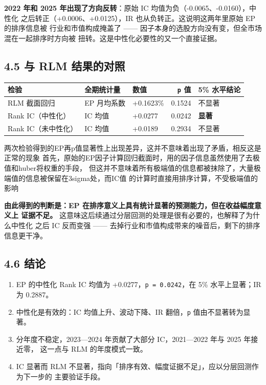 \documentclass[UTF8,a4paper,11pt]{ctexart}
\begin{document}
\textbf{2022 年和 2025 年出现了方向反转}：原始 IC 均值为负（-0.0065、-0.0160），中性化
之后转正（+0.0006、+0.0125），IR 也从负转正。这说明这两年里原始 EP 的排序信息被
行业和市值构成掩盖了 —— 因子本身的选股方向没有变，但全市场混在一起排序时方向被
扭转。这是中性化必要性的又一个直接证据。

{}
\subsection*{4.5 与 RLM 结果的对照}

\begin{table}[htbp]
\centering
\begin{tabularx}{\textwidth}{@{}YYYRY@{}}
\toprule
检验 & 全期统计量 & 数值 & \texttt{p} 值 & 5\% 水平结论 \\
\midrule
RLM 截面回归 & EP 月均系数 & +0.1623\% & 0.1524 & 不显著 \\
Rank IC（中性化） & IC 均值 & +0.0277 & 0.0242 & \textbf{显著} \\
Rank IC（未中性化） & IC 均值 & +0.0189 & 0.2934 & 不显著 \\
\bottomrule
\end{tabularx}
\end{table}

两次检验得到的EP再p值显著性上出现差异，这并不意味着出现了矛盾，相反这是正常的现象
首先，原始的EP因子计算回归截面时，用的因子信息虽然使用了去极值和huber将权重的手段，
但这并不意味着所有极端值的信息都被抹除了，大量极端值的信息被保留在3sigma处，而IC值
的计算时直接用排序计算，不受极端值的影响

\textbf{由此得到的判断是：EP 在排序意义上具有统计显著的预测能力，但在收益幅度意义上
证据不足。} 这意味这后续通过分层回测的处理是很有必要的，也解释了为什么中性化
之后 IC 反而变强 —— 去掉行业和市值构成带来的噪音后，剩下的排序信息更干净。

{}
\subsection*{4.6 结论}

\begin{enumerate}[leftmargin=2.2em,itemsep=2pt,topsep=3pt]
\item 
EP 的中性化 Rank IC 均值为 +0.0277，\texttt{p = 0.0242}，在 5\% 水平上显著；IR 为 0.2887。

\item 
中性化是有效的：IC 均值上升、波动下降、IR 翻倍，\texttt{p} 值由不显著转为显著。

\item 
分年度不稳定，2023—2024 年贡献了大部分 IC，2021—2022 年与 2025 年接近零，
这一点与 RLM 的年度模式一致。

\item 
IC 显著而 RLM 不显著，指向「排序有效、幅度证据不足」，应以分层回测作为下一步的
主要验证手段。

\end{enumerate}
\end{document}
